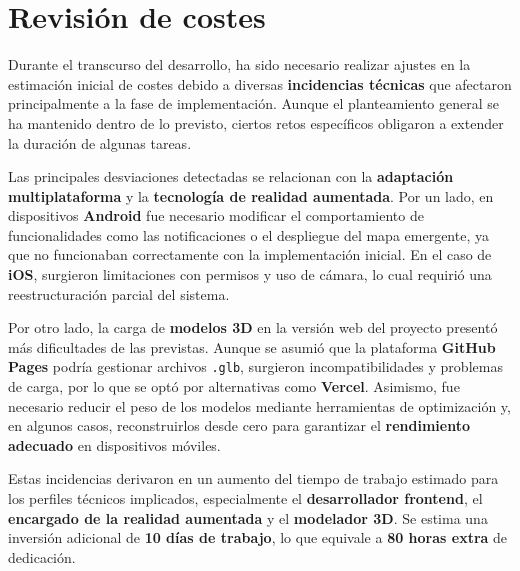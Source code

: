 

\section{Revisión de costes}

Durante el transcurso del desarrollo, ha sido necesario realizar ajustes en la estimación inicial de costes debido a diversas \textbf{incidencias técnicas} que afectaron principalmente a la fase de implementación. Aunque el planteamiento general se ha mantenido dentro de lo previsto, ciertos retos específicos obligaron a extender la duración de algunas tareas.

Las principales desviaciones detectadas se relacionan con la \textbf{adaptación multiplataforma} y la \textbf{tecnología de realidad aumentada}. Por un lado, en dispositivos \textbf{Android} fue necesario modificar el comportamiento de funcionalidades como las notificaciones o el despliegue del mapa emergente, ya que no funcionaban correctamente con la implementación inicial. En el caso de \textbf{iOS}, surgieron limitaciones con permisos y uso de cámara, lo cual requirió una reestructuración parcial del sistema.

Por otro lado, la carga de \textbf{modelos 3D} en la versión web del proyecto presentó más dificultades de las previstas. Aunque se asumió que la plataforma \textbf{GitHub Pages} podría gestionar archivos \texttt{.glb}, surgieron incompatibilidades y problemas de carga, por lo que se optó por alternativas como \textbf{Vercel}. Asimismo, fue necesario reducir el peso de los modelos mediante herramientas de optimización y, en algunos casos, reconstruirlos desde cero para garantizar el \textbf{rendimiento adecuado} en dispositivos móviles.

Estas incidencias derivaron en un aumento del tiempo de trabajo estimado para los perfiles técnicos implicados, especialmente el \textbf{desarrollador frontend}, el \textbf{encargado de la realidad aumentada} y el \textbf{modelador 3D}. Se estima una inversión adicional de \textbf{10 días de trabajo}, lo que equivale a \textbf{80 horas extra} de dedicación.

\begin{table}[H]
\centering
\caption{Ampliación de jornadas y costes adicionales}
\end{table}

